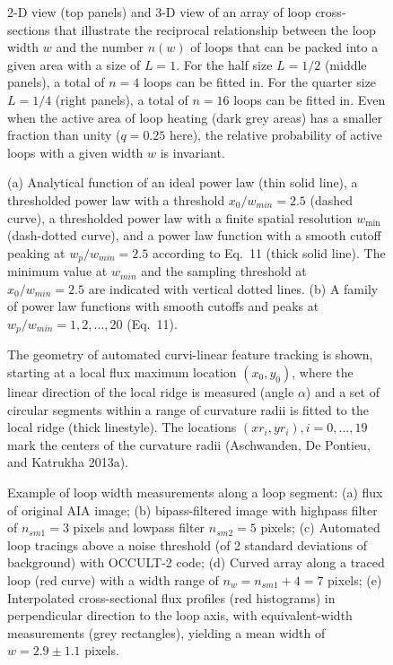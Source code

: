 \documentclass[10pt,preprint]{aastex}  %
\begin{document}

\begin{figure}
\caption{2-D view (top panels) and 3-D view of an array of loop
cross-sections that illustrate the reciprocal relationship between
the loop width $w$ and the number $n(w)$ of loops that can be packed
into a given area with a size of $L=1$. For the half size $L=1/2$ 
(middle panels),
a total of $n=4$ loops can be fitted in. For the quarter size $L=1/4$
(right panels), a total of $n=16$ loops can be fitted in. Even when
the active area of loop heating (dark grey areas) has a smaller
fraction than unity ($q=0.25$ here), the relative probability
of active loops with a given width $w$ is invariant.}
\end{figure}
\clearpage

\begin{figure}
\caption{(a) Analytical function of an ideal power law (thin solid line),
a thresholded power law with a threshold $x_0/w_{min}=2.5$ 
(dashed curve), a thresholded power law with a finite spatial resolution 
$w_{\mathrm{min}}$ (dash-dotted curve), and a power law function with
a smooth cutoff peaking at $w_p/w_{min}=2.5$ according to Eq.~11 
(thick solid line). The minimum value at $w_{min}$ and the sampling 
threshold at $x_0/w_{min}=2.5$ are indicated with vertical dotted lines.
(b) A family of power law functions with smooth cutoffs and
peaks at $w_p/w_{min}=1, 2, ..., 20$ (Eq.~11).}
\end{figure}

\begin{figure}
\caption{The geometry of automated curvi-linear feature tracking
is shown, starting at a local flux maximum location $(x_0,y_0)$,
where the linear direction of the local ridge is measured
(angle $\alpha$) and a set of circular segments within a range
of curvature radii is fitted to the local ridge (thick linestyle).
The locations $(xr_i, yr_i), i=0,...,19$ mark the centers of the
curvature radii (Aschwanden, De Pontieu, and Katrukha 2013a).}
\end{figure}

\begin{figure}
\caption{Example of loop width measurements along a loop segment:
(a) flux of original
AIA image; (b) bipass-filtered image with highpass filter
of $n_{sm1}=3$ pixels and lowpass filter $n_{sm2}=5$ pixels;
(c) Automated loop tracings above a noise threshold (of 2 standard
deviations of background) with OCCULT-2 code; (d) Curved array 
along a traced loop (red curve) with a width range of 
$n_w=n_{sm1}+4=7$ pixels; (e) Interpolated cross-sectional flux 
profiles (red histograms) in perpendicular direction to the loop axis,  
with equivalent-width measurements (grey rectangles), yielding
a mean width of $w=2.9\pm1.1$ pixels.}
\end{figure}
\end{document}
